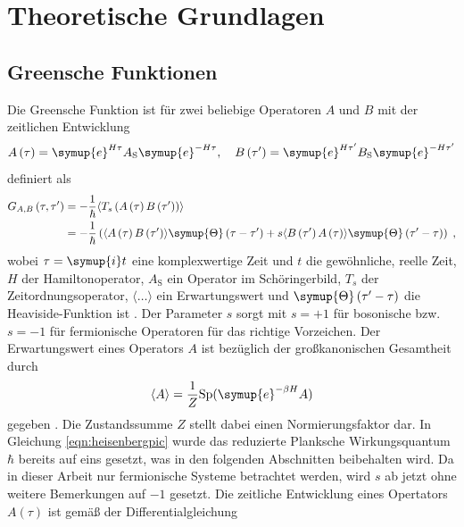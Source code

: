 \chapter{Theoretische Grundlagen}
\label{chap:theoretische_grundlagen}
\section{Greensche Funktionen}
Die Greensche Funktion ist für zwei beliebige Operatoren $A$ und $B$ mit der zeitlichen Entwicklung 
\begin{equation}
    A \left ( \tau \right ) = \symup{e}^{H \tau} A_\text{S} \symup{e}^{-H \tau}  \label{eqn:heisenbergpic}, 
    \quad B \left ( \tau' \right ) = \symup{e}^{H \tau'} B_\text{S} \symup{e}^{-H \tau'}
\end{equation}
definiert als 
\begin{align}
    G_{A,B} \left (\tau, \tau' \right ) &= - \frac{1}{\hbar} \langle T_s \left ( A \left (\tau \right ) B \left ( \tau' \right ) \right ) \rangle \\
    & = - \frac{1}{\hbar} \left(  \langle A \left (\tau \right ) B \left ( \tau' \right ) \rangle \symup{\Theta} \left ( \tau - \tau' \right) + s 
    \langle B \left ( \tau' \right ) A \left (\tau \right ) \rangle \symup{\Theta} \left ( \tau' - \tau \right)  \right ) \; \text{,} \label{eqn:greensfunction}
\end{align}
wobei $\tau = \symup{i}t$ eine komplexwertige Zeit und $t$ die gewöhnliche, reelle Zeit, $H$ der Hamiltonoperator, $A_\text{S}$ ein Operator im Schöringerbild, $T_s$ der Zeitordnungsoperator, 
$\langle \ldots \rangle$ ein Erwartungswert und $\symup{\Theta} \left ( \tau' - \tau \right)$ die Heaviside-Funktion ist \cite{greensfunction}.
Der Parameter $s$ sorgt mit $s=+1$ für bosonische bzw. $s=-1$ für fermionische Operatoren für das richtige Vorzeichen.
Der Erwartungswert eines Operators $A$ ist bezüglich der großkanonischen Gesamtheit durch 
\begin{equation*}
    \langle A \rangle = \frac{1}{Z} \text{Sp}(\symup{e}^{-\beta H} A)
\end{equation*}
gegeben \cite{greensfunction}.
Die Zustandssumme $Z$ stellt dabei einen Normierungsfaktor dar.
In Gleichung \eqref{eqn:heisenbergpic} wurde das reduzierte Planksche Wirkungsquantum $\hbar$ bereits auf eins gesetzt, was in den folgenden Abschnitten beibehalten wird.
Da in dieser Arbeit nur fermionische Systeme betrachtet werden, wird $s$ ab jetzt ohne weitere Bemerkungen auf $-1$ gesetzt.
Die zeitliche Entwicklung eines Opertators $A (\tau)$ ist gemäß der Differentialgleichung 
